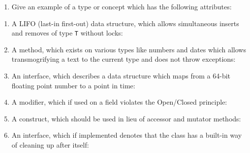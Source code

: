 
\pgfmathsetmacro{}

\begin{enumerate}[a]
	\item {} Give an example of a type or concept which has the following attributes:
\end{enumerate}

\begin{enumerate}
	\item A LIFO (last-in first-out) data structure, which allows simultaneous inserts and removes of type \texttt{T} without locks:\ %
			\ifdefined\questionThreeAnswerOne
			  \newline\answer\questionThreeAnswerOne
			\else
			\fi

	\item A method, which exists on various types like numbers and dates which allows transmogrifying a text to the current type and does not throw exceptions:\ %
			\ifdefined\questionThreeAnswerTwo
			  \newline\answer\questionThreeAnswerTwo
			\else
			\fi

	\item An interface, which describes a data structure which maps from a 64-bit floating point number to a point in time:\ %
			\ifdefined\questionThreeAnswerThree
			  \newline\answer\questionThreeAnswerThree
			\else
			\fi

	\item A modifier, which if used on a field violates the Open/Closed principle:\ %
			\ifdefined\questionThreeAnswerFour
			  \newline\answer\questionThreeAnswerFour
			\else
			\fi

	\item A construct, which should be used in lieu of accessor and mutator methods:\ %
			\ifdefined\questionThreeAnswerFive
			  \newline\answer\questionThreeAnswerFive
			\else
			\fi

	\item An interface, which if implemented denotes that the class has a built-in way of cleaning up after itself:\ %
			\ifdefined\questionThreeAnswerSix
			  \newline\answer\questionThreeAnswerSix
			\else
			\fi


\end{enumerate}
